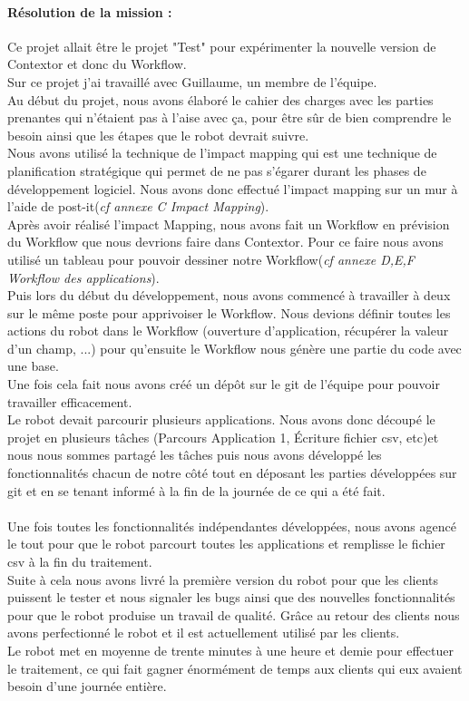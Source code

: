 \documentclass[a4paper,twoside,12pt]{report}
\begin{document}
\paragraph {Résolution de la mission :}
Ce projet allait être le projet "Test" pour expérimenter la nouvelle version de Contextor et donc du Workflow.\\
Sur ce projet j'ai travaillé avec Guillaume, un membre de l'équipe.\\
Au début du projet, nous avons élaboré le cahier des charges avec les parties prenantes qui n'étaient pas à l'aise avec ça, pour être sûr de bien comprendre le besoin ainsi que les étapes que le robot devrait suivre.\\
Nous avons utilisé la technique de l'impact mapping qui est une technique de planification stratégique qui permet de ne pas s'égarer durant les phases de développement logiciel. Nous avons donc effectué l'impact mapping sur un mur à l'aide de post-it(\emph{cf annexe C Impact Mapping}).\\
Après avoir réalisé l'impact Mapping, nous avons fait un Workflow en prévision du Workflow que nous devrions faire dans Contextor. Pour ce faire nous avons utilisé un tableau pour pouvoir dessiner notre Workflow(\emph{cf annexe D,E,F Workflow des applications}).\\
Puis lors du début du développement, nous avons commencé à travailler à deux sur le même poste pour apprivoiser le Workflow. Nous devions définir toutes les actions du robot dans le Workflow (ouverture d'application, récupérer la valeur d'un champ, ...) pour qu'ensuite le Workflow nous génère une partie du code avec une base.\\
Une fois cela fait nous avons créé un dépôt sur le git de l'équipe pour pouvoir travailler efficacement.\\
Le robot devait parcourir plusieurs applications. Nous avons donc découpé le projet en plusieurs tâches (Parcours Application 1, Écriture fichier csv, etc)et nous nous sommes partagé les tâches puis nous avons développé les fonctionnalités chacun de notre côté tout en déposant les parties développées sur git et en se tenant informé à la fin de la journée de ce qui a été fait.\\\\
Une fois toutes les fonctionnalités indépendantes développées, nous avons agencé le tout pour que le robot parcourt toutes les applications et remplisse le fichier csv à la fin du traitement.\\
Suite à cela nous avons livré la première version du robot pour que les clients puissent le tester et nous signaler les bugs ainsi que des nouvelles fonctionnalités pour que le robot produise un travail de qualité.
Grâce au retour des clients nous avons perfectionné le robot et il est actuellement utilisé par les clients.\\
Le robot met en moyenne de trente minutes à une heure et demie pour effectuer le traitement, ce qui fait gagner énormément de temps aux clients qui eux avaient besoin d'une journée entière.
\end{document}
